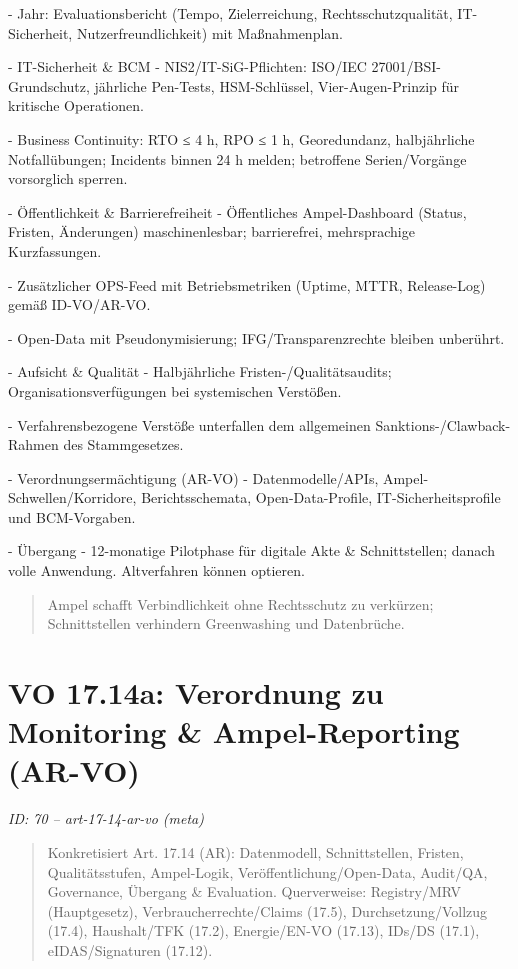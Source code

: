 \documentclass[12pt,a4paper]{scrartcl}
\begin{document}
- Jahr: Evaluationsbericht (Tempo, Zielerreichung, Rechtsschutzqualität, IT-Sicherheit, Nutzerfreundlichkeit) mit Maßnahmenplan.

- IT-Sicherheit \& BCM
- NIS2/IT-SiG-Pflichten: ISO/IEC 27001/BSI-Grundschutz, jährliche Pen-Tests, HSM-Schlüssel, Vier-Augen-Prinzip für kritische Operationen.

- Business Continuity: RTO ≤ 4 h, RPO ≤ 1 h, Georedundanz, halbjährliche Notfallübungen; Incidents binnen 24 h melden; betroffene Serien/Vorgänge vorsorglich sperren.

- Öffentlichkeit \& Barrierefreiheit
- Öffentliches Ampel-Dashboard (Status, Fristen, Änderungen) maschinenlesbar; barrierefrei, mehrsprachige Kurzfassungen.

- Zusätzlicher OPS-Feed mit Betriebsmetriken (Uptime, MTTR, Release-Log) gemäß ID-VO/AR-VO.

- Open-Data mit Pseudonymisierung; IFG/Transparenzrechte bleiben unberührt.

- Aufsicht \& Qualität
- Halbjährliche Fristen-/Qualitätsaudits; Organisationsverfügungen bei systemischen Verstößen.

- Verfahrensbezogene Verstöße unterfallen dem allgemeinen Sanktions-/Clawback-Rahmen des Stammgesetzes.

- Verordnungsermächtigung (AR-VO)
- Datenmodelle/APIs, Ampel-Schwellen/Korridore, Berichtsschemata, Open-Data-Profile, IT-Sicherheitsprofile und BCM-Vorgaben.

- Übergang
- 12-monatige Pilotphase für digitale Akte \& Schnittstellen; danach volle Anwendung. Altverfahren können optieren.

{\footnotesize\begin{quote}
Ampel schafft Verbindlichkeit ohne Rechtsschutz zu verkürzen; Schnittstellen verhindern Greenwashing und Datenbrüche.
\end{quote}}



\section[VO 17.14a: Verordnung zu Monitoring \& Ampel-Reporting (AR-VO)]{VO 17.14a: Verordnung zu Monitoring \& Ampel-Reporting (AR-VO)}
\noindent\textit{ID: 70 -- art-17-14-ar-vo (meta)}

\begin{quote}
Konkretisiert Art. 17.14 (AR): Datenmodell, Schnittstellen, Fristen, Qualitätsstufen, Ampel-Logik, Veröffentlichung/Open-Data, Audit/QA, Governance, Übergang \& Evaluation. Querverweise: Registry/MRV (Hauptgesetz), Verbraucherrechte/Claims (17.5), Durchsetzung/Vollzug (17.4), Haushalt/TFK (17.2), Energie/EN-VO (17.13), IDs/DS (17.1), eIDAS/Signaturen (17.12).
\end{quote}
\end{document}
